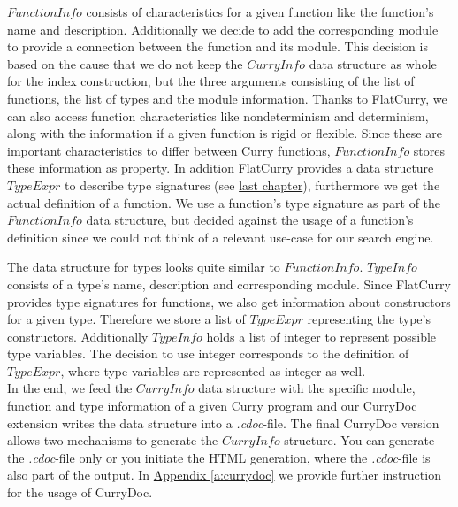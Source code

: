 \documentclass[%
	pdftex,%
	a4paper,%
	oneside,%
	chapterprefix,%
	headsepline,%
	12pt%
]{scrbook}
\newcommand{\Conid}[1]{\mathit{#1}}
\begin{document}
\ensuremath{\Conid{FunctionInfo}} consists of characteristics for a given function like
the function's name and description. %
Additionally we decide to add the corresponding module to provide a
connection between the function and its module. %
This decision is based on the cause that we do not keep the
\ensuremath{\Conid{CurryInfo}} data structure as whole for the index construction, but
the three arguments consisting of the list of functions, the list of
types and the module information. %
Thanks to FlatCurry, we can also access function characteristics like
nondeterminism and determinism, along with the information if a given
function is rigid or flexible. %
Since these are important characteristics to differ between Curry
functions, \ensuremath{\Conid{FunctionInfo}} stores these information as property. %
In addition FlatCurry provides a data structure \ensuremath{\Conid{TypeExpr}} to describe
type signatures (see \hyperref[fig:typeExpr]{last chapter}),
furthermore we get the actual definition of a function. %
We use a function's type signature as part of the \ensuremath{\Conid{FunctionInfo}} data
structure, but decided against the usage of a function's definition
since we could not think of a relevant use-case for our search engine.

The data structure for types looks quite similar to \ensuremath{\Conid{FunctionInfo}}. %
\ensuremath{\Conid{TypeInfo}} consists of a type's name, description and corresponding
module. %
Since FlatCurry provides type signatures for functions, we also get
information about constructors for a given type. %
Therefore we store a list of \ensuremath{\Conid{TypeExpr}} representing the type's
constructors. %
Additionally \ensuremath{\Conid{TypeInfo}} holds a list of integer to represent possible
type variables. %
The decision to use integer corresponds to the definition of
\ensuremath{\Conid{TypeExpr}}, where type variables are represented as integer as well.\\

In the end, we feed the \ensuremath{\Conid{CurryInfo}} data structure with the specific
module, function and type information of a given Curry program and our
CurryDoc extension writes the data structure into a
\emph{.cdoc}-file. %
The final CurryDoc version allows two mechanisms to generate the
\ensuremath{\Conid{CurryInfo}} structure. %
You can generate the \emph{.cdoc}-file only or you initiate the HTML
generation, where the \emph{.cdoc}-file is also part of the output. %
In \hyperref[a:currydoc]{Appendix \ref{a:currydoc}} we provide further
instruction for the usage of CurryDoc.
\end{document}
